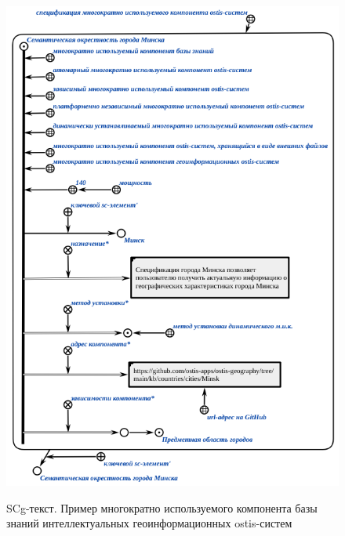 \begin{figure}[H]
	\caption{SCg-текст. Пример многократно используемого компонента базы знаний интеллектуальных геоинформационных ostis-систем}
	\includegraphics[scale=0.8]{author/part7/figures/gis_kb_component.png}
	\label{fig:gis_kb_component}
\end{figure}

